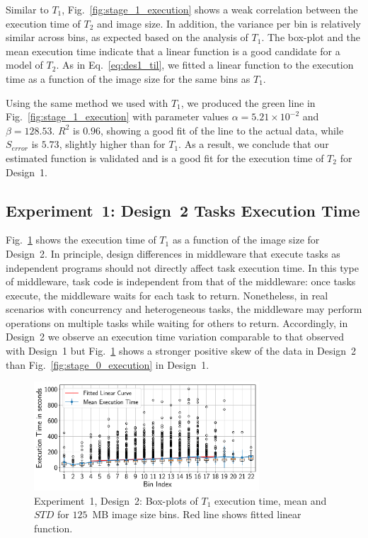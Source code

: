 Similar to $T_{1}$, Fig.~\ref{fig:stage_1_execution} shows a weak correlation 
between the execution time of $T_{2}$ and image size. In addition, the 
variance per bin is relatively similar across bins, as expected based on the 
analysis of $T_{1}$. The box-plot and the mean execution time indicate that a 
linear function is a good candidate for a model of $T_{2}$. As in 
Eq.~\ref{eq:des1_til}, we fitted a linear function to the execution time as a 
function of the image size for the same bins as $T_{1}$.

Using the same method we used with $T_{1}$, we produced the green line in 
Fig.~\ref{fig:stage_1_execution} with parameter values 
$\alpha = 5.21 \times 10^{-2}$ and $\beta = 128.53$. $R^{2}$ is $0.96$, 
showing a good fit of the line to the actual data, while $S_{error}$ is 
$5.73$, slightly higher than for $T_{1}$. As a result, we conclude that our 
estimated function is validated and is a good fit for the execution time of 
$T_{2}$ for Design~1.

\subsection{Experiment~1: Design~2 Tasks Execution Time}

Fig.~\ref{fig:stage_1_execution_des2} shows the execution time of $T_{1}$ as a 
function of the image size for Design~2. In principle, design differences in 
middleware that execute tasks as independent programs should not directly 
affect task execution time. In this type of middleware, task code is 
independent from that of the middleware: once tasks execute, the middleware 
waits for each task to return. Nonetheless, in real scenarios with concurrency 
and heterogeneous tasks, the middleware may perform operations on multiple 
tasks while waiting for others to return. Accordingly, in Design~2 we observe 
an execution time variation comparable to that observed with Design~1 but 
Fig.~\ref{fig:stage_1_execution_des2} shows a stronger positive skew of the 
data in Design~2 than Fig.~\ref{fig:stage_0_execution} in Design~1.

\begin{figure}[t]
    \centering
    \includegraphics[width=0.75\textwidth]{figures/designs/stage_0_tx_box_des2.pdf}
    \caption{Experiment~1, Design~2: Box-plots of $T_{1}$ execution time, mean 
    and $STD$ for $125$~MB image size bins. Red line shows fitted linear 
    function.}
    \label{fig:stage_1_execution_des2}
\end{figure}



